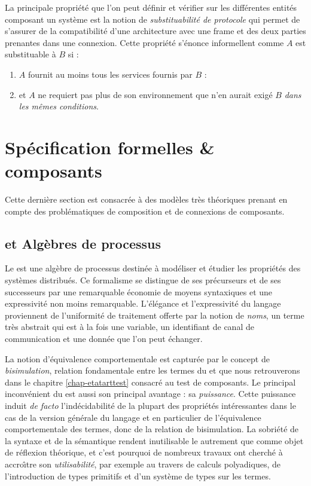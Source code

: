 La principale propri\'et\'e que l'on peut d\'efinir et v\'erifier
sur les diff\'erentes entit\'es composant un syst\`eme est la
notion de \emph{substituabilit\'e de protocole} qui permet de
s'assurer de la compatibilit\'e d'une architecture avec une frame et
des deux parties prenantes dans une connexion.  Cette propri\'et\'e
s'\'enonce informellent comme $A$ est substituable \`a $B$ si :
\begin{enumerate}
  \item  $A$ fournit au moins tous les services fournis par $B$ :
  \item et $A$ ne requiert pas plus de son environnement que n'en aurait
  exig\'e $B$ \emph{dans les m\^emes conditions}.
\end{enumerate}

\section{Sp\'ecification formelles \& composants}

Cette derni\`ere section est consacr\'ee \`a des mod\`eles tr\`es
th\'eoriques prenant en compte des probl\'ematiques de composition et de
connexions de composants. 

\subsection{\pc et Alg\`ebres de processus}

Le \pc\cite{calcmp1,calcmp2} est une alg\`ebre de processus
destin\'ee \`a mod\'eliser et
\'etudier les propri\'et\'es des syst\`emes distribu\'es. Ce
formalisme se distingue de ses pr\'ecurseurs et de ses successeurs par une
remarquable \'economie de moyens syntaxiques et une expressivit\'e
non moins remarquable. 
L'\'el\'egance et l'expressivit\'e  du
langage proviennent de l'uniformit\'e de traitement offerte par la
notion de \emph{noms}, un terme tr\`es abstrait qui est \`a la fois une
variable, un identifiant de canal de communication et une donn\'ee
que l'on peut \'echanger. 

La notion d'\'equivalence comportementale est captur\'ee par le
concept de \emph{bisimulation}, relation fondamentale entre les termes
du \pc et que nous retrouverons dans
le chapitre \ref{chap-etatarttest} consacr\'e au test de composants. Le principal
inconv\'enient du \pc est aussi son principal avantage : sa
\emph{puissance}. Cette puissance  induit \emph{de facto}
l'ind\'ecidabilit\'e de la plupart des propri\'et\'es
int\'eressantes dans le cas de la version g\'en\'erale du langage
 et en particulier de
l'\'equivalence comportementale des termes, donc de la relation de
bisimulation. La sobri\'et\'e de la syntaxe et de la s\'emantique
rendent inutilisable le \pc autrement que comme objet de r\'eflexion
th\'eorique, et c'est pourquoi de nombreux travaux ont cherch\'e
\`a accro\^{\i}tre son \og \emph{utilisabilit\'e}\fg, par exemple au
travers de calculs polyadiques, de l'introduction de types primitifs
et d'un syst\`eme de types sur les termes.

